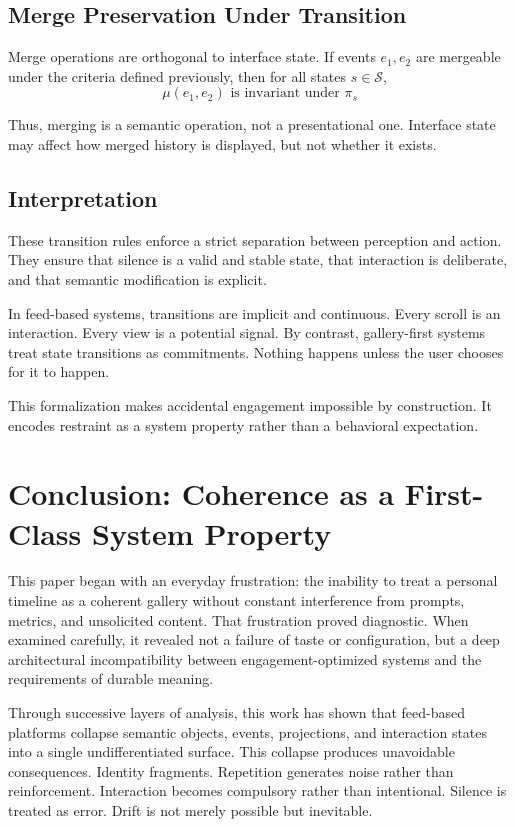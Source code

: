 \documentclass[11pt,oneside]{article}
\begin{document}
\subsection{Merge Preservation Under Transition}

Merge operations are orthogonal to interface state. If events $e_1, e_2$ are mergeable under the criteria defined previously, then for all states $s \in \mathcal{S}$,
\[
\mu(e_1, e_2) \text{ is invariant under } \pi_s
\]

Thus, merging is a semantic operation, not a presentational one. Interface state may affect how merged history is displayed, but not whether it exists.

\subsection{Interpretation}

These transition rules enforce a strict separation between perception and action. They ensure that silence is a valid and stable state, that interaction is deliberate, and that semantic modification is explicit.

In feed-based systems, transitions are implicit and continuous. Every scroll is an interaction. Every view is a potential signal. By contrast, gallery-first systems treat state transitions as commitments. Nothing happens unless the user chooses for it to happen.

This formalization makes accidental engagement impossible by construction. It encodes restraint as a system property rather than a behavioral expectation.

\section{Conclusion: Coherence as a First-Class System Property}

This paper began with an everyday frustration: the inability to treat a personal timeline as a coherent gallery without constant interference from prompts, metrics, and unsolicited content. That frustration proved diagnostic. When examined carefully, it revealed not a failure of taste or configuration, but a deep architectural incompatibility between engagement-optimized systems and the requirements of durable meaning.

Through successive layers of analysis, this work has shown that feed-based platforms collapse semantic objects, events, projections, and interaction states into a single undifferentiated surface. This collapse produces unavoidable consequences. Identity fragments. Repetition generates noise rather than reinforcement. Interaction becomes compulsory rather than intentional. Silence is treated as error. Drift is not merely possible but inevitable.
\end{document}
